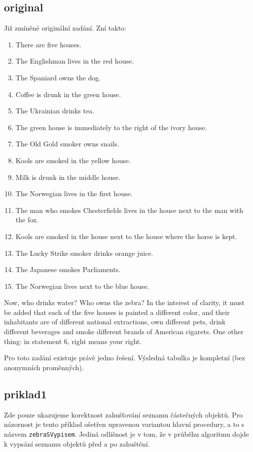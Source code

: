 \documentclass[11pt]{article} %
\begin{document}
\subsection{original}
Již zmíněné originální zadání. Zní takto:
\begin{framed}
\begin{enumerate} \itemsep1pt \parskip0pt 
\item There are five houses.
\item The Englishman lives in the red house.
\item The Spaniard owns the dog.
\item Coffee is drunk in the green house.
\item The Ukrainian drinks tea.
\item The green house is immediately to the right of the ivory house.
\item The Old Gold smoker owns snails.
\item Kools are smoked in the yellow house.
\item Milk is drunk in the middle house.
\item The Norwegian lives in the first house.
\item The man who smokes Chesterfields lives in the house next to the man with the fox. 
\item Kools are smoked in the house next to the house where the horse is kept. 
\item The Lucky Strike smoker drinks orange juice.
\item The Japanese smokes Parliaments.
\item The Norwegian lives next to the blue house.
\end{enumerate}
 Now, who drinks water? Who owns the zebra? In the interest of clarity, it must be added that each of the five houses is painted a different color, and their inhabitants are of different national extractions, own different pets, drink different beverages and smoke different brands of American cigarets. One other thing: in statement 6, right means your right. 
\end{framed}
Pro toto zadání existuje právě jedno řešení. Výsledná tabulka je kompletní (bez anonymních proměnných).

\subsection{priklad1}
Zde pouze ukazujeme korektnost zahušťování seznamu částečných objektů. Pro názornost je tento příklad ošetřen upravenou variantou hlavní procedury, a to s názvem \texttt{zebraSVypisem}. Jediná odlišnost je v tom, že v průběhu algoritmu dojde k vypsání seznamu objektů před a po zahuštění.
\end{document}
